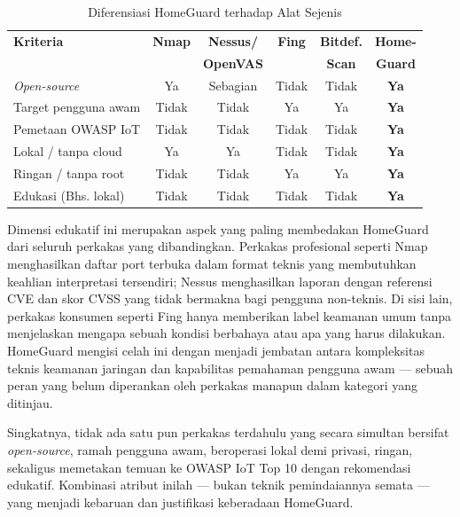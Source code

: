 \begin{table}[ht]
    \centering
    \caption{Diferensiasi HomeGuard terhadap Alat Sejenis}
    \label{tab:diferensiasi}
    \footnotesize
    \begin{tabular}{|p{2.2cm}|c|c|c|c|c|}
        \hline
        \textbf{Kriteria} & \textbf{Nmap} & \textbf{Nessus/} &
        \textbf{Fing} & \textbf{Bitdef.} & \textbf{Home-} \\
         & & \textbf{OpenVAS} & & \textbf{Scan} & \textbf{Guard} \\
        \hline
        \textit{Open-source} & Ya & Sebagian & Tidak & Tidak & \textbf{Ya} \\
        \hline
        Target pengguna awam & Tidak & Tidak & Ya & Ya & \textbf{Ya} \\
        \hline
        Pemetaan OWASP IoT & Tidak & Tidak & Tidak & Tidak & \textbf{Ya} \\
        \hline
        Lokal / tanpa cloud & Ya & Ya & Tidak & Tidak & \textbf{Ya} \\
        \hline
        Ringan / tanpa root & Tidak & Tidak & Ya & Ya & \textbf{Ya} \\
        \hline
        Edukasi (Bhs. lokal) & Tidak & Tidak & Tidak & Tidak & \textbf{Ya} \\
        \hline
    \end{tabular}
\end{table}

Dimensi edukatif ini merupakan aspek yang paling membedakan HomeGuard dari
seluruh perkakas yang dibandingkan. Perkakas profesional seperti Nmap
menghasilkan daftar port terbuka dalam format teknis yang membutuhkan keahlian
interpretasi tersendiri; Nessus menghasilkan laporan dengan referensi CVE dan
skor CVSS yang tidak bermakna bagi pengguna non-teknis. Di sisi lain, perkakas
konsumen seperti Fing hanya memberikan label keamanan umum tanpa menjelaskan
mengapa sebuah kondisi berbahaya atau apa yang harus dilakukan. HomeGuard
mengisi celah ini dengan menjadi jembatan antara kompleksitas teknis keamanan
jaringan dan kapabilitas pemahaman pengguna awam --- sebuah peran yang belum
diperankan oleh perkakas manapun dalam kategori yang ditinjau.

Singkatnya, tidak ada satu pun perkakas terdahulu yang secara simultan
bersifat \textit{open-source}, ramah pengguna awam, beroperasi lokal demi
privasi, ringan, sekaligus memetakan temuan ke OWASP IoT Top 10 dengan
rekomendasi edukatif. Kombinasi atribut inilah --- bukan teknik
pemindaiannya semata --- yang menjadi kebaruan dan justifikasi keberadaan
HomeGuard.
